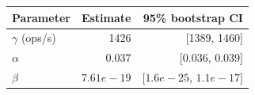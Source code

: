 \begin{tabular}{@{}lrr@{}}
\toprule
Parameter & Estimate & 95\% bootstrap CI \\
\midrule
$\gamma$ (ops/s) & 1426 & [1389, 1460] \\
$\alpha$ & 0.037 & [0.036, 0.039] \\
$\beta$ & $7.61e-19$ & [$1.6e-25$, $1.1e-17$] \\
\bottomrule
\end{tabular}
